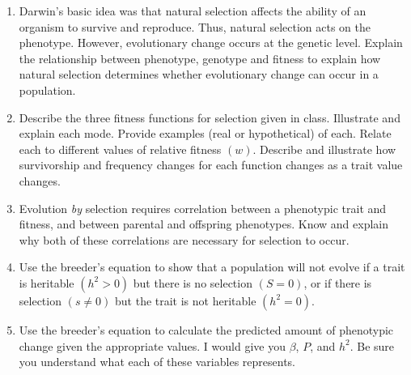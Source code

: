 \documentclass[letterpaper]{tufte-handout}
\begin{document}
\begin{enumerate}
	
	\item Darwin's basic idea was that natural selection affects the ability of an organism to survive and reproduce.  Thus, natural selection acts on the phenotype.  However, evolutionary change occurs at the genetic level.  Explain the relationship between phenotype, genotype and fitness to explain how natural selection determines whether evolutionary change can occur in a population.
	
	\item Describe the three fitness functions for selection given in class.  Illustrate and explain each mode.  Provide examples (real or hypothetical) of each.  Relate each to different values of relative fitness $\left(w\right)$. Describe and illustrate how survivorship and frequency changes for each function changes as a trait value changes.
	
	\item Evolution \emph{by} selection requires correlation between a phenotypic trait and fitness, and between parental and offspring phenotypes. Know and explain why both of these correlations are necessary for selection to occur.
	
	\item Use the breeder's equation to show that a population will not evolve if a trait is heritable $(h^2 > 0)$ but there is no selection $(S = 0)$, or if there is selection $(s \ne 0)$ but the trait is not heritable $(h^2 = 0)$.
	
	\item Use the breeder's equation to calculate the predicted amount of phenotypic change given the appropriate values. I would give you $\beta$, $P$, and $h^2$. Be sure you understand what each of these variables represents.


\end{enumerate}
\end{document}
